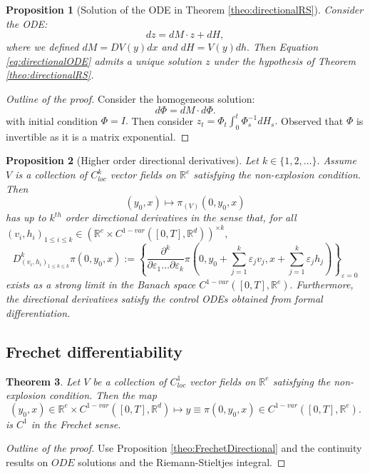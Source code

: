 \documentclass{article}
\newcommand{\R}{\mathbb{R}}
\newtheorem{theorem}{Theorem}
\newtheorem{prop}[theorem]{Proposition}
\begin{document}
\begin{prop}[Solution of the ODE in Theorem \ref{theo:directionalRS}]
    Consider the ODE:
    \begin{equation}\label{eq:directionalODE}
        dz = dM \cdot z + dH, 
    \end{equation}
    where we defined $dM = DV(y) dx$ and $dH = V(y) dh.$
    Then Equation \eqref{eq:directionalODE} admits a unique solution $z$ under the hypothesis of Theorem \ref{theo:directionalRS}.
\end{prop}
\begin{proof}[Outline of the proof]
    Consider the homogeneous solution:
    \begin{equation}
        d \Phi = dM \cdot d \Phi.
    \end{equation}
    with initial condition $\Phi = I.$
    Then consider $z_t = \Phi_t \int_0^t \Phi_s^{-1} dH_s.$
    Observed that $\Phi$ is invertible as it is a matrix exponential.
\end{proof}

\begin{prop}[Higher order directional derivatives]
    Let $k \in \{ 1, 2, \ldots \}.$
    Assume $V$ is a collection of $C^k_{loc}$ vector fields on $\R^e$ satisfying the non-explosion condition. Then
    \begin{equation*}
        (y_0, x) \mapsto \pi_{(V)}(0, y_0, x)
    \end{equation*}
    has up to $k^{th}$ order directional derivatives in the sense that, for all $(v_i, h_i)_{1 \leq i \leq k} \in (\R^e \times C^{1-var}([0,T], \R^d))^{\times k},$
    \begin{equation*}
        D_{(v_i, h_i)_{1 \leq k \leq k}}^k \pi(0, y_0, x) := \left\{ \frac{\partial^k}{\partial \varepsilon_1 \ldots \partial \varepsilon_k} \pi \left( 0, y_0 + \sum_{j=1}^k \varepsilon_j v_j, x + \sum_{j=1}^k \varepsilon_j h_j \right) \right\}_{\varepsilon = 0}
    \end{equation*}
    exists as a strong limit in the Banach space $C^{1-var}([0,T], \R^e).$
    Furthermore, the directional derivatives satisfy the control ODEs obtained from formal differentiation.
\end{prop}

\subsection{Frechet differentiability}

\begin{theorem}
    Let $V$ be a collection of $C^1_{loc}$ vector fields on $\R^e$ satisfying the non-explosion condition. Then the map
    \begin{equation}
        (y_0, x) \in \R^e \times C^{1-var}([0,T], \R^d) \mapsto y \equiv \pi(0, y_0, x) \in C^{1-var}([0,T], \R^e).
    \end{equation}
    is $C^1$ in the Frechet sense.
\end{theorem}
\begin{proof}[Outline of the proof]
    Use Proposition \ref{theo:FrechetDirectional} and the continuity results on $ODE$ solutions and the Riemann-Stieltjes integral.
\end{proof}
\appendix
\end{document}
